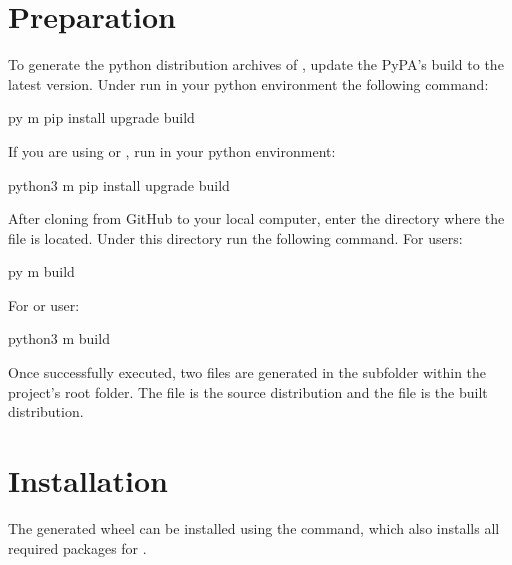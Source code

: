 \documentclass[letterpaper,10pt,english]{sphinxmanual}
\begin{document}
\section{Preparation}
\label{\detokenize{install:preparation}}
\sphinxAtStartPar
To generate the python distribution archives of , update the PyPA’s build to the latest version. Under  run in your python environment the following command:

\begin{sphinxVerbatim}[commandchars=\\\{\}]
py \PYGZhy{}m pip install \PYGZhy{}\PYGZhy{}upgrade build
\end{sphinxVerbatim}

\sphinxAtStartPar
If you are using  or , run in your python environment:

\begin{sphinxVerbatim}[commandchars=\\\{\}]
python3 \PYGZhy{}m pip install \PYGZhy{}\PYGZhy{}upgrade build
\end{sphinxVerbatim}

\sphinxAtStartPar
After cloning  from GitHub to your local computer, enter the  directory where the file  is located. Under this directory run the following  command. For  users:

\begin{sphinxVerbatim}[commandchars=\\\{\}]
py \PYGZhy{}m build
\end{sphinxVerbatim}

\sphinxAtStartPar
For  or  user:

\begin{sphinxVerbatim}[commandchars=\\\{\}]
python3 \PYGZhy{}m build
\end{sphinxVerbatim}

\sphinxAtStartPar
Once successfully executed, two files are generated in the  subfolder within the project’s root folder. The  file is the source distribution and the  file is the built distribution.


\section{Installation}
\label{\detokenize{install:installation}}
\sphinxAtStartPar
The generated wheel can be installed using the  command, which also installs all required packages for .
\end{document}
